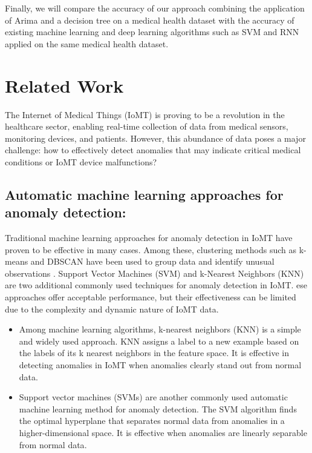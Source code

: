 \documentclass[conference]{IEEEtran}
\begin{document}
Finally, we will compare the accuracy of our approach combining the application of Arima and a decision tree on a medical health dataset with the accuracy of existing machine learning and deep learning algorithms such as SVM and RNN applied on the same medical health dataset.

\section{Related Work}



The Internet of Medical Things (IoMT) is proving to be a revolution in the healthcare sector, enabling real-time collection of data from medical sensors, monitoring devices, and patients. However, this abundance of data poses a major challenge: how to effectively detect anomalies that may indicate critical medical conditions or IoMT device malfunctions?


\subsection{Automatic machine learning approaches for anomaly detection:}
Traditional machine learning approaches for anomaly detection in IoMT have proven to be effective in many cases. Among these, clustering methods such as k-means and DBSCAN have been used to group data and identify unusual observations \cite{b1}. Support Vector Machines (SVM) and k-Nearest Neighbors (KNN) are two additional commonly used techniques for anomaly detection in IoMT.
ese approaches offer acceptable performance, but their effectiveness can be limited due to the complexity and dynamic nature of IoMT data\cite{b2}.
\begin{itemize}

\item Among machine learning algorithms, k-nearest neighbors (KNN) is a simple and widely used approach. KNN assigns a label to a new example based on the labels of its k nearest neighbors in the feature space. It is effective in detecting anomalies in IoMT when anomalies clearly stand out from normal data.
\item 
Support vector machines (SVMs) are another commonly used automatic machine learning method for anomaly detection. The SVM algorithm finds the optimal hyperplane that separates normal data from anomalies in a higher-dimensional space. It is effective when anomalies are linearly separable from normal data\cite{b3}.

\end{itemize}
\end{document}
